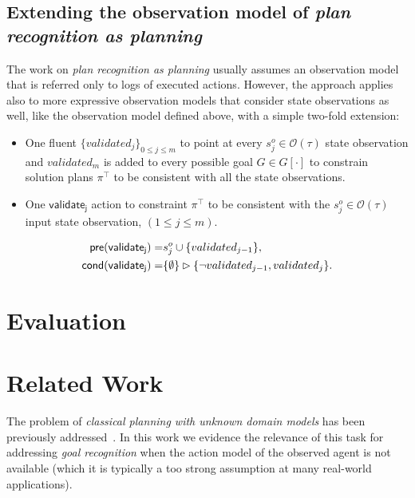 \documentclass[letterpaper]{article} %
\newcommand{\pre}{\mathsf{pre}}     %
\newcommand{\cond}{\mathsf{cond}}   %
\begin{document}
\subsection{Extending the observation model of {\em plan recognition as planning}}
The work on {\em plan recognition as planning} usually assumes an observation model that is referred only to logs of executed actions. However, the approach applies also to more expressive observation models that consider state observations as well, like the observation model defined above, with a simple two-fold extension:
\begin{itemize}
\item One fluent $\{validated_j\}_{0\leq j\leq m}$ to point at every $s_j^o\in\mathcal{O}(\tau)$ state observation and $validated_m$ is added to every possible goal $G\in G[\cdot]$ to constrain solution plans $\pi^\top$ to be consistent with all the state observations.
\item One $\mathsf{validate_{j}}$ action to constraint $\pi^\top$ to be consistent with the $s_j^o\in\mathcal{O}(\tau)$ input state observation, {\small $(1\leq j\leq m)$}.  
\end{itemize}
\begin{small}
\begin{align*}
\hspace*{7pt}\pre(\mathsf{validate_{j}})=&s_j^o\cup\{validated_{j-1}\},\\
\cond(\mathsf{validate_{j}})=&\{\emptyset\}\rhd\{\neg validated_{j-1}, validated_j\}.
\end{align*}
\end{small}



\section{Evaluation}
\label{sec:evaluation}

\section{Related Work}
\label{sec:evaluation}
The problem of {\em classical planning with unknown domain models} has been previously addressed~\cite{SternJ17}. In this work we evidence the relevance of this task for addressing {\em goal recognition} when the action model of the observed agent is not available (which it is typically a too strong assumption at many real-world applications).   
\end{document}
